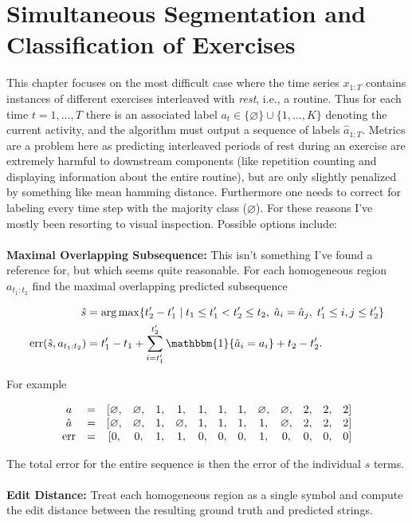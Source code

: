 \documentclass[12pt]{report}
\newcommand{\p}[0]{\prime}
\newcommand{\err}[0]{\text{\textnormal{err}}}
\newcommand{\1}[0]{\mathbbm{1}}
\newcommand{\seq}[3]{\ensuremath{#1_{{#2}:{#3}}}}
\begin{document}
\chapter{Simultaneous Segmentation and Classification of Exercises}
This chapter focuses on the most difficult case where the time series $\seq{x}{1}{T}$
contains instances of different exercises interleaved with \emph{rest}, i.e., a routine.
Thus for each time $t = 1,\ldots,T$ there is an associated label
$a_t \in \{\varnothing\} \cup \{1, \ldots, K\}$ denoting the current activity, and the algorithm
must output a sequence of labels $\seq{\hat{a}}{1}{T}$.
Metrics are a problem here as predicting interleaved periods of rest during an exercise
are extremely harmful to downstream components (like repetition counting and displaying
information about the entire routine), but are only slightly penalized by something like
mean hamming distance. Furthermore one needs to correct for labeling every time step with the
majority class ($\varnothing$). For these reasons I've mostly been resorting to visual
inspection. Possible options include:
\\\\
\textbf{Maximal Overlapping Subsequence:} This isn't something I've found a reference for,
but which seems quite reasonable. For each homogeneous region $\seq{a}{t_1}{t_2}$ find the
maximal overlapping predicted subsequence

\begin{align*}
    \hat{s} &=
    \arg\max\{t_2^\p - t_1^\p \mid t_1 \le t_1^\p < t_2^\p \le t_2,\; \hat{a}_i = \hat{a}_j,\; t_1^\p \le i,j \le t_2^\p\} \\
    \err(\hat{s}, \seq{a}{t_1}{t_2}) &= t_1^\p - t_1 + \sum_{i=t_1^\p}^{t_2^\p} \1\{\hat{a}_i = a_i\} + t_2 - t_2^\p.
\end{align*}

For example

\[\begin{array}{c c c c c c c c c c c c c c}
    a       &=& [\varnothing,& \varnothing,& 1,& 1,          & 1,& 1,& 1,& \varnothing,& \varnothing,& 2,& 2,& 2] \\
    \hat{a} &=& [\varnothing,& \varnothing,& 1,& \varnothing,& 1,& 1,& 1,& 1,          & \varnothing,& 2,& 2,& 2] \\
    \err    &=& [0,          & 0,          & 1,& 1,          & 0,& 0,& 0,& 1,          & 0,          & 0,& 0,& 0] \\
\end{array}\]

The total error for the entire sequence is then the error of the individual $s$ terms.
\\\\
\textbf{Edit Distance:} Treat each homogeneous region as a single symbol and compute the edit
distance between the resulting ground truth and predicted strings.



\end{document}
